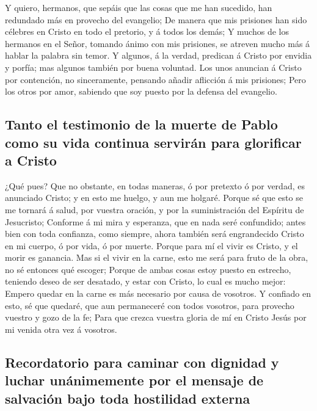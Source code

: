 Y quiero, hermanos, que sepáis que las cosas que me han
sucedido, han redundado más en provecho del evangelio; 
De manera que mis prisiones han sido célebres en Cristo en todo el
pretorio, y á todos los demás;  Y muchos de los hermanos
en el Señor, tomando ánimo con mis prisiones, se atreven mucho más á
hablar la palabra sin temor.  Y algunos, á la verdad,
predican á Cristo por envidia y porfía; mas algunos también por buena
voluntad.  Los unos anuncian á Cristo por contención, no
sinceramente, pensando añadir aflicción á mis prisiones; 
Pero los otros por amor, sabiendo que soy puesto por la defensa del
evangelio.

\hypertarget{tanto-el-testimonio-de-la-muerte-de-pablo-como-su-vida-continua-serviruxe1n-para-glorificar-a-cristo}{%
\subsection{Tanto el testimonio de la muerte de Pablo como su vida
continua servirán para glorificar a
Cristo}\label{tanto-el-testimonio-de-la-muerte-de-pablo-como-su-vida-continua-serviruxe1n-para-glorificar-a-cristo}}

 ¿Qué pues? Que no obstante, en todas maneras, ó por
pretexto ó por verdad, es anunciado Cristo; y en esto me huelgo, y aun
me holgaré.  Porque sé que esto se me tornará á salud,
por vuestra oración, y por la suministración del Espíritu de Jesucristo;
 Conforme á mi mira y esperanza, que en nada seré
confundido; antes bien con toda confianza, como siempre, ahora también
será engrandecido Cristo en mi cuerpo, ó por vida, ó por muerte.
 Porque para mí el vivir es Cristo, y el morir es
ganancia.  Mas si el vivir en la carne, esto me será para
fruto de la obra, no sé entonces qué escoger;  Porque de
ambas cosas estoy puesto en estrecho, teniendo deseo de ser desatado, y
estar con Cristo, lo cual es mucho mejor:  Empero quedar
en la carne es más necesario por causa de vosotros.  Y
confiado en esto, sé que quedaré, que aun permaneceré con todos
vosotros, para provecho vuestro y gozo de la fe;  Para
que crezca vuestra gloria de mí en Cristo Jesús por mi venida otra vez á
vosotros.

\hypertarget{recordatorio-para-caminar-con-dignidad-y-luchar-unuxe1nimemente-por-el-mensaje-de-salvaciuxf3n-bajo-toda-hostilidad-externa}{%
\subsection{Recordatorio para caminar con dignidad y luchar unánimemente
por el mensaje de salvación bajo toda hostilidad
externa}\label{recordatorio-para-caminar-con-dignidad-y-luchar-unuxe1nimemente-por-el-mensaje-de-salvaciuxf3n-bajo-toda-hostilidad-externa}}

